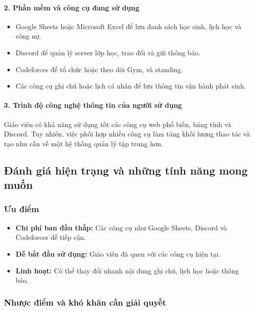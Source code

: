 \documentclass[12pt,a4paper]{article}
\newcommand{\code}[1]{{\ttfamily\seqsplit{#1}}}
\begin{document}
\paragraph{2. Phần mềm và công cụ đang sử dụng}
\begin{itemize}[leftmargin=*]
\item Google Sheets hoặc Microsoft Excel để lưu danh sách học sinh, lịch học và công nợ.
\item Discord để quản lý server lớp học, trao đổi và gửi thông báo.
\item Codeforces để tổ chức hoặc theo dõi Gym, \code{GymProblem} và standing.
\item Các công cụ ghi chú hoặc lịch cá nhân để lưu thông tin vận hành phát sinh.
\end{itemize}

\paragraph{3. Trình độ công nghệ thông tin của người sử dụng}
Giáo viên có khả năng sử dụng tốt các công cụ web phổ biến, bảng tính và
Discord. Tuy nhiên, việc phối hợp nhiều công cụ làm tăng khối lượng thao tác và
tạo nhu cầu về một hệ thống quản lý tập trung hơn.

\subsection{Đánh giá hiện trạng và những tính năng mong muốn}

\subsubsection{Ưu điểm}

\begin{itemize}[leftmargin=*]
\item \textbf{Chi phí ban đầu thấp:} Các công cụ như Google Sheets, Discord và Codeforces dễ tiếp cận.
\item \textbf{Dễ bắt đầu sử dụng:} Giáo viên đã quen với các công cụ hiện tại.
\item \textbf{Linh hoạt:} Có thể thay đổi nhanh nội dung ghi chú, lịch học hoặc thông báo.
\end{itemize}

\subsubsection{Nhược điểm và khó khăn cần giải quyết}
\end{document}
